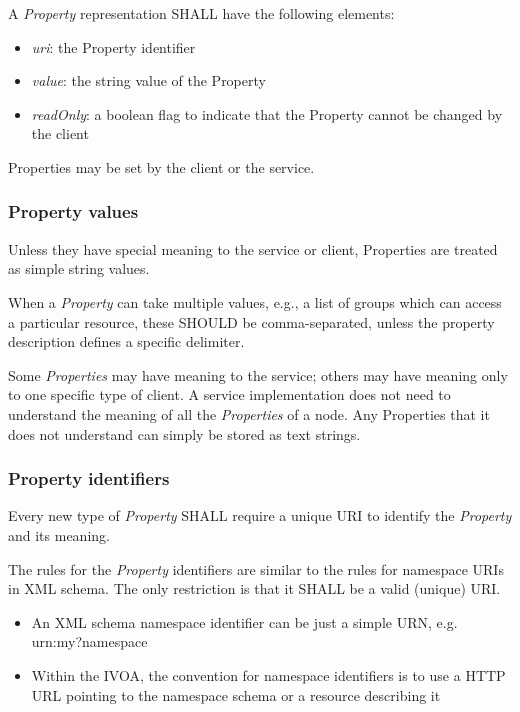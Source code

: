 \documentclass[11pt,a4paper]{ivoa}
\begin{document}
A \emph{Property} representation SHALL have the following elements:

\begin{itemize}
    \item \emph{uri}: the Property identifier
    \item \emph{value}: the string value of the Property
    \item \emph{readOnly}: a boolean flag to indicate that the Property cannot be changed by the client
\end{itemize}

Properties may be set by the client or the service.

\subsubsection{Property values}
Unless they have special meaning to the service or client, Properties are treated as simple string values.

When a \emph{Property} can take multiple values, e.g., a list of groups which can access a particular resource, these SHOULD be comma-separated, unless the property description defines a specific delimiter.

Some \emph{Properties} may have meaning to the service; others may have meaning only to one specific type of client. A service implementation does not need to understand the meaning of all the \emph{Properties} of a node. Any Properties that it does not understand can simply be stored as text strings.

\subsubsection{Property identifiers}
Every new type of \emph{Property} SHALL require a unique URI to identify the \emph{Property} and its meaning.

The rules for the \emph{Property} identifiers are similar to the rules for namespace URIs in XML schema. The only restriction is that it SHALL be a valid (unique) URI.

\begin{itemize}
    \item An XML schema namespace identifier can be just a simple URN, e.g. urn:my?namespace
    \item Within the IVOA, the convention for namespace identifiers is to use a HTTP URL pointing to the namespace schema or a resource describing it
\end{itemize}
\end{document}
